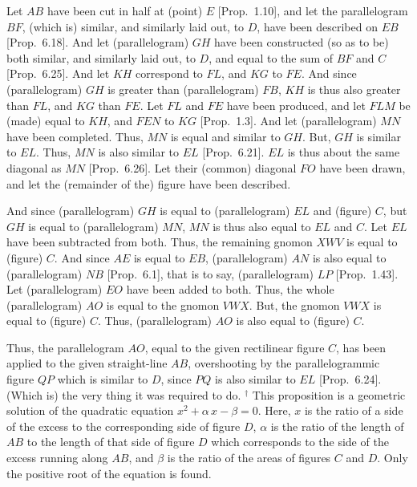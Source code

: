 Let $AB$ have been cut in half at (point) $E$  [Prop.~1.10], and
let the parallelogram $BF$, (which is) similar, and similarly laid out, to $D$,
have been described on $EB$ [Prop.~6.18].
And let (parallelogram) $GH$ have been constructed (so as to be) both similar, and similarly laid out, to $D$, and equal to the sum of $BF$ and $C$ [Prop.~6.25]. And let $KH$ correspond to
$FL$, and $KG$ to $FE$. And since (parallelogram) $GH$ is greater than 
(parallelogram) $FB$, $KH$ is thus
also greater than $FL$, and $KG$ than $FE$.  Let $FL$ and $FE$ have been produced,
and let $FLM$ be (made) equal to $KH$, and $FEN$ to $KG$  [Prop.~1.3]. 
And let (parallelogram) $MN$ have been completed. Thus, $MN$ is equal and
similar  to $GH$. But, $GH$ is similar to $EL$. Thus, $MN$  is also similar to
$EL$ [Prop.~6.21]. $EL$ is thus about the
same diagonal as $MN$ [Prop.~6.26]. 
Let their (common) diagonal $FO$ have been drawn, and let the (remainder
of the) figure have been described.

And since (parallelogram) $GH$ is equal to (parallelogram) $EL$ and (figure) $C$,
but $GH$ is equal to (parallelogram) $MN$, $MN$ is thus also equal to $EL$ and
$C$. Let $EL$ have been subtracted from both. Thus, the remaining gnomon
$XWV$ is equal to (figure) $C$. And since $AE$ is equal to $EB$, (parallelogram)
$AN$ is also equal to (parallelogram) $NB$ [Prop.~6.1], that is to say, (parallelogram) $LP$  [Prop.~1.43]. Let
(parallelogram) $EO$ have been added to both. Thus, the whole (parallelogram)
$AO$ is equal to the gnomon $VWX$. But, the gnomon $VWX$ is equal to (figure)
$C$. Thus, (parallelogram) $AO$ is also equal to (figure) $C$.

Thus, the parallelogram $AO$, equal to the given rectilinear figure $C$, has been applied to the given straight-line
$AB$, overshooting by the parallelogrammic figure $QP$ which is similar to $D$,
since $PQ$ is also similar to $EL$ [Prop.~6.24].
(Which is) the very thing it was required to do.
{\footnotesize\noindent$^\dag$ This proposition is a geometric
solution of the quadratic equation $x^2 + \alpha\,x -\beta = 0$. Here,
$x$ is the ratio of a side of the excess to the corresponding side of figure $D$, $\alpha$
is the ratio of the length of $AB$ to the length of that side of figure $D$ which corresponds to the side of the excess running along $AB$, and $\beta$ is the
ratio of the areas of figures $C$ and $D$. Only the positive root of the equation is found.}


